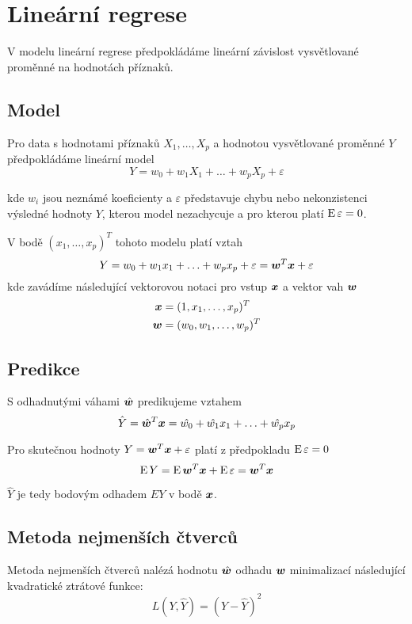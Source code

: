 \documentclass[../main.tex]{subfiles}
\begin{document}
\section{Lineární regrese}

V modelu lineární regrese předpokládáme lineární závislost vysvětlované proměnné na hodnotách příznaků.

\subsection{Model}

Pro data s hodnotami příznaků $X_1, \ldots, X_p$ a hodnotou vysvětlované proměnné $Y$ předpokládáme lineární model
\begin{equation*}
    Y = w_0 + w_1 X_1 + \ldots + w_p X_p + \varepsilon
\end{equation*}

kde $w_i$ jsou neznámé koeficienty a $\varepsilon$ představuje chybu nebo nekonzistenci výsledné hodnoty $Y$, kterou model nezachycuje a pro kterou platí $\operatorname{E} \varepsilon = 0$.

V bodě $(x_1, \ldots, x_p)^T$ tohoto modelu platí vztah \[ Y = w_0 + w_1 x_1 + \ldots + w_p x_p + \varepsilon = \bm{w}^T \bm{x} + \varepsilon \] kde zavádíme následující vektorovou notaci pro vstup $\bm{x}$ a vektor vah $\bm{w}$
\begin{align*}
    \bm{x}  & = (1, x_1, \ldots, x_p)^T   \\
    \bm{w} & = (w_0, w_1, \ldots, w_p)^T
\end{align*}

\subsection{Predikce}

S odhadnutými váhami $\hat{\bm{w}}$ predikujeme vztahem
\[\hat{Y} = \hat{\bm{w}}^T\bm{x} = \hat{w_0} + \hat{w_1} x_1 + \ldots + \hat{w_p} x_p\]

Pro skutečnou hodnoty $Y = \bm{w}^T \bm{x} + \varepsilon$ platí z předpokladu $\operatorname{E} \varepsilon = 0$ \[\operatorname{E} Y = \operatorname{E} \bm{w}^T \bm{x} + \operatorname{E} \varepsilon = \bm{w}^T \bm{x}\]

$\hat{Y}$ je tedy bodovým odhadem $EY$ v bodě $\bm{x}$.

\subsection{Metoda nejmenších čtverců}

Metoda nejmenších čtverců nalézá hodnotu $\hat{\bm{w}}$ odhadu $\bm{w}$ minimalizací následující kvadratické ztrátové funkce: \[L(Y, \hat{Y}) = (Y - \hat{Y})^2\]
\end{document}
